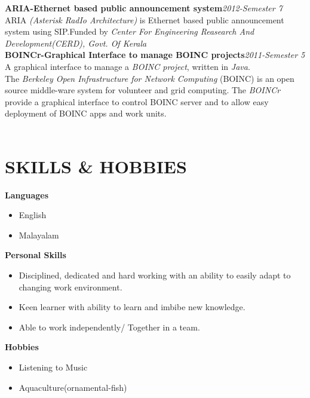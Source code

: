 \documentclass[line,margin]{res}
\begin{document}
\begin{resume}
	    	  {\bf ARIA-Ethernet based public announcement system}\hfill {\it 2012-Semester 7}\\
	          
	    	  ARIA {\it (Asterisk RadIo Architecture)} is Ethernet based public announcement system using SIP.Funded by {\it Center For Engineering Reasearch And Development(CERD), Govt. Of Kerala}\\
	                          
              {\bf BOINCr-Graphical Interface to manage BOINC projects}\hfill {\it 2011-Semester 5}\\
	                          
	     	  A graphical interface to manage a {\it BOINC project}, written in {\it Java}.\\
	     	  The {\it Berkeley Open Infrastructure for Network Computing }(BOINC) is an open source middle-ware system for volunteer and grid computing. The {\it BOINCr} provide a graphical interface to control BOINC server and to allow easy deployment of BOINC apps and work units.\\\\	
	                          
	  \section{SKILLS \& HOBBIES}
	          {\bf Languages}
	          \begin{itemize} \itemsep -2pt
	          \item English
	          \item Malayalam
	          \end{itemize}
	          {\bf Personal Skills}
	          \begin{itemize} \itemsep -2pt
	          \item Disciplined, dedicated and hard working with an ability to easily adapt to changing work environment.
	          \item Keen learner with ability to learn and imbibe new knowledge.
	          \item Able to work independently/ Together in a team.
	          \end{itemize}
	          {\bf Hobbies}
	          \begin{itemize} \itemsep -2pt
	          \item Listening to Music
	          \item Aquaculture(ornamental-fish)
	          \end{itemize}
	          \vspace{10 mm}                                 

\end{resume}
\end{document}
